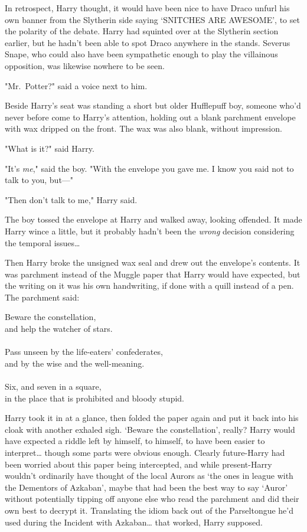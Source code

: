 In retrospect, Harry thought, it would have been nice to have Draco unfurl his 
own banner from the Slytherin side saying `SNITCHES ARE AWESOME', to set the 
polarity of the debate. Harry had squinted over at the Slytherin section 
earlier, but he hadn't been able to spot Draco anywhere in the stands. Severus 
Snape, who could also have been sympathetic enough to play the villainous 
opposition, was likewise nowhere to be seen.

"Mr.~Potter?" said a voice next to him.

Beside Harry's seat was standing a short but older Hufflepuff boy, someone 
who'd never before come to Harry's attention, holding out a blank parchment 
envelope with wax dripped on the front. The wax was also blank, without 
impression.

"What is it?" said Harry.

"It's \emph{me}," said the boy. "With the envelope you gave me. I know you said 
not to talk to you, but---"

"Then don't talk to me," Harry said.

The boy tossed the envelope at Harry and walked away, looking offended. It made 
Harry wince a little, but it probably hadn't been the \emph{wrong} decision 
considering the temporal issues{\ldots}

Then Harry broke the unsigned wax seal and drew out the envelope's contents. It 
was parchment instead of the Muggle paper that Harry would have expected, but 
the writing on it was his own handwriting, if done with a quill instead of a 
pen. The parchment said:

\begin{writtenNote}
Beware the constellation,\\
and help the watcher of stars.\\
\\
Pass unseen by the life-eaters' confederates,\\
and by the wise and the well-meaning.\\
\\
Six, and seven in a square,\\
in the place that is prohibited and bloody stupid.
\end{writtenNote}

Harry took it in at a glance, then folded the paper again and put it back into 
his cloak with another exhaled sigh. `Beware the constellation', really? Harry 
would have expected a riddle left by himself, to himself, to have been easier 
to interpret{\ldots} though some parts were obvious enough. Clearly 
future-Harry had been worried about this paper being intercepted, and while 
present-Harry wouldn't ordinarily have thought of the local Aurors as `the ones 
in league with the Dementors of Azkaban', maybe that had been the best way to 
say `Auror' without potentially tipping off anyone else who read the parchment 
and did their own best to decrypt it. Translating the idiom back out of the 
Parseltongue he'd used during the Incident with Azkaban{\ldots} that worked, 
Harry supposed.

